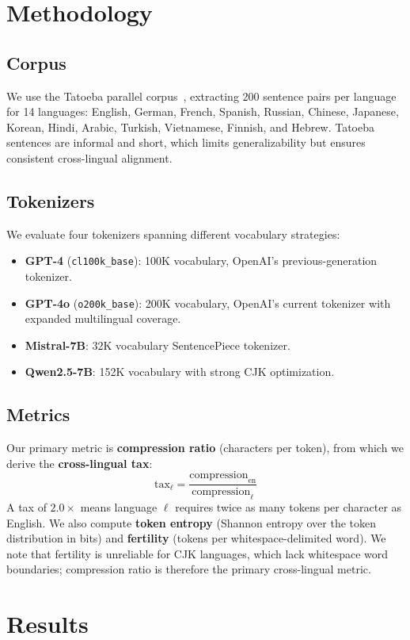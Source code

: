 \documentclass[11pt]{article}
\begin{document}
\section{Methodology}

\subsection{Corpus}
We use the Tatoeba parallel corpus~\cite{tatoeba}, extracting 200 sentence pairs per language for 14 languages: English, German, French, Spanish, Russian, Chinese, Japanese, Korean, Hindi, Arabic, Turkish, Vietnamese, Finnish, and Hebrew.
Tatoeba sentences are informal and short, which limits generalizability but ensures consistent cross-lingual alignment.

\subsection{Tokenizers}
We evaluate four tokenizers spanning different vocabulary strategies:
\begin{itemize}
  \item \textbf{GPT-4} (\texttt{cl100k\_base}): 100K vocabulary, OpenAI's previous-generation tokenizer.
  \item \textbf{GPT-4o} (\texttt{o200k\_base}): 200K vocabulary, OpenAI's current tokenizer with expanded multilingual coverage.
  \item \textbf{Mistral-7B}: 32K vocabulary SentencePiece tokenizer.
  \item \textbf{Qwen2.5-7B}: 152K vocabulary with strong CJK optimization.
\end{itemize}

\subsection{Metrics}
Our primary metric is \textbf{compression ratio} (characters per token), from which we derive the \textbf{cross-lingual tax}:
\[
  \text{tax}_\ell = \frac{\text{compression}_{\text{en}}}{\text{compression}_\ell}
\]
A tax of $2.0\times$ means language $\ell$ requires twice as many tokens per character as English.
We also compute \textbf{token entropy} (Shannon entropy over the token distribution in bits) and \textbf{fertility} (tokens per whitespace-delimited word).
We note that fertility is unreliable for CJK languages, which lack whitespace word boundaries; compression ratio is therefore the primary cross-lingual metric.

\section{Results}
\end{document}
